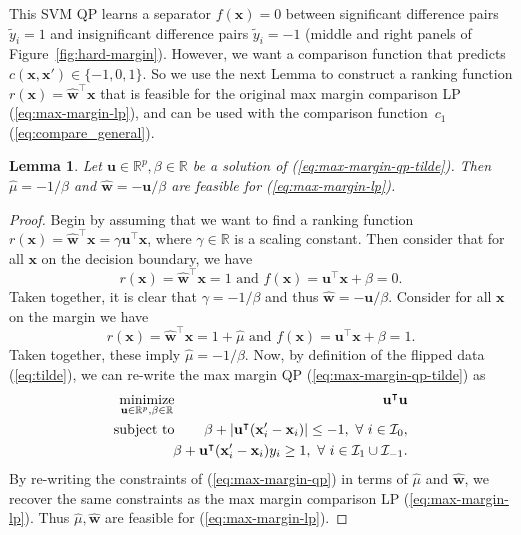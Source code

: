 \documentclass{article}
\newtheorem{lemma}{Lemma}
\newcommand{\RR}{\mathbb R}
\DeclareMathOperator*{\minimize}{minimize}
\begin{document}
This SVM QP learns a separator $f(\mathbf x)=0$ between significant
difference pairs $\tilde y_i=1$ and insignificant difference pairs
$\tilde y_i=-1$ (middle and right panels of
Figure~\ref{fig:hard-margin}). However, we want a comparison function
that predicts $c(\mathbf x,\mathbf x')\in\{-1,0,1\}$. So we use the
next Lemma to construct a ranking function $r(\mathbf x)= \mathbf{\hat
  w}^\intercal \mathbf x$ that is feasible for the original max margin
comparison LP (\ref{eq:max-margin-lp}), and can be used with the
comparison function~$c_1$ (\ref{eq:compare_general}).
\begin{lemma}
  Let $\mathbf u\in\RR^p,\beta\in\RR$ be a solution of
  (\ref{eq:max-margin-qp-tilde}). Then $\hat \mu = -1/\beta$ and
  $\mathbf{\hat w} = -\mathbf u/\beta$ are feasible for
  (\ref{eq:max-margin-lp}).
  \label{lemma:feasible}
\end{lemma}
\begin{proof}
  Begin by assuming that we want to find a ranking function $r(\mathbf
  x)=\mathbf{\hat w}^\intercal \mathbf x = \gamma \mathbf u^\intercal
  \mathbf x$, where $\gamma\in\RR$ is a scaling constant. Then
  consider that for all $\mathbf x$ on the decision boundary, we have
  \begin{equation}
    \label{eq:dec-boundary-rank}
    r(\mathbf x) = \mathbf{\hat w}^\intercal \mathbf x = 1\text{ and } 
    f(\mathbf x) = \mathbf u^\intercal \mathbf x + \beta = 0.
  \end{equation}
  Taken together, it is clear that $\gamma=-1/\beta$ and thus
  $\mathbf{\hat w} = -\mathbf u/\beta$. Consider for all $\mathbf x$ on the
  margin we have
  \begin{equation}
    \label{eq:margin-rank}
    r(\mathbf x) = \mathbf{\hat w}^\intercal \mathbf x = 1+\hat\mu\text{ and } 
    f(\mathbf x) = \mathbf u^\intercal \mathbf x + \beta= 1.
  \end{equation}
  Taken together, these imply $\hat \mu=-1/\beta$. Now, by definition
  of the flipped data (\ref{eq:tilde}), we can re-write the max margin
  QP (\ref{eq:max-margin-qp-tilde}) as
\begin{eqnarray}
  \label{eq:max-margin-qp}
    \minimize_{\mathbf u\in\RR^p, \beta\in\RR}\ &&
    \hskip -0.5cm \mathbf u^\intercal \mathbf u  \\
    \text{subject to}\ &&\hskip -0.5cm
    \nonumber \beta + |\mathbf u^\intercal (\mathbf x_i'-\mathbf x_i)| \leq -1,\
    \forall\  i\in \mathcal I_0,\\
    &&\hskip -0.5cm
\nonumber \beta + \mathbf u^\intercal(\mathbf x_i'-\mathbf x_i)y_i \geq 1,
\ \forall\ i \in \mathcal I_1\cup \mathcal I_{-1}.
\end{eqnarray}
By re-writing the constraints of (\ref{eq:max-margin-qp}) in terms of
$\hat \mu$ and $\mathbf{\hat w}$, we recover the same constraints as
the max margin comparison LP (\ref{eq:max-margin-lp}). Thus $\hat \mu,
\mathbf{\hat w}$ are feasible for (\ref{eq:max-margin-lp}).
\end{proof}
\end{document}
